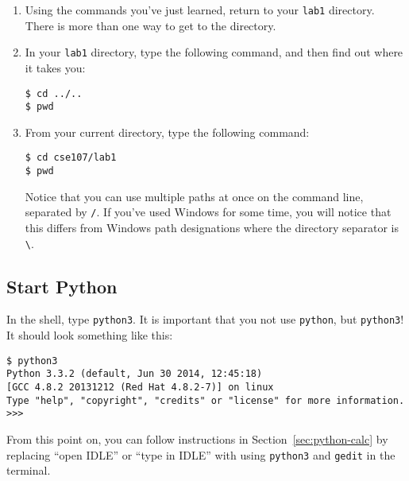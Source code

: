 \documentclass[12pt,hidelinks]{article}
\begin{document}
\begin{appendices}
\begin{enumerate}
\item Using the commands you've just learned, return to your \texttt{lab1} directory. There is more than one way to get to the directory.

\item In your \texttt{lab1} directory, type the following command, and then find out where it takes you:
\begin{lstlisting}[style=bash]
$ cd ../..
$ pwd
\end{lstlisting}

\item From your current directory, type the following command:
\begin{lstlisting}[style=bash]
$ cd cse107/lab1
$ pwd
\end{lstlisting}
Notice that you can use multiple paths at once on the command line, separated by \texttt{/}. If you've used Windows for some time, you will notice that this differs from Windows path designations where the directory separator is \texttt{\textbackslash}.

\end{enumerate}

\subsection{Start Python}

In the shell, type \texttt{python3}. It is important that you not use
\texttt{python}, but \texttt{python3}! It should look something like this:
\begin{lstlisting}[style=bash]
$ python3
Python 3.3.2 (default, Jun 30 2014, 12:45:18) 
[GCC 4.8.2 20131212 (Red Hat 4.8.2-7)] on linux
Type "help", "copyright", "credits" or "license" for more information.
>>> 
\end{lstlisting}

From this point on, you can follow instructions in
Section~\ref{sec:python-calc} by replacing ``open IDLE'' or ``type in IDLE''
with using \texttt{python3} and \texttt{gedit} in the terminal.

\end{appendices}
\end{document}
